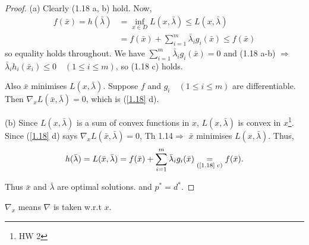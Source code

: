 \begin{proof}
    (a) Clearly (1.18 a, b) hold. Now, 
    \begin{align*}
        f(\bar{x}) = h(\bar{\lambda}) &= \inf\limits_{x\in D} L(x, \bar{\lambda}) \le L(x, \bar{\lambda}) \\
        & = f(\bar{x}) + \sum\limits_{i=1}^m \bar{\lambda}_i g_i(\bar{x}) \le f(\bar{x})
    \end{align*}
    so equality holds throughout. We have $\sum\limits_{i=1}^m \bar{\lambda}_i g_i(\bar{x}) = 0$ and (1.18 a-b) $\Rightarrow$ $\bar{\lambda}_i h_i(\bar{x}_i)\le 0\quad (1\le i\le m)$, so (1.18 c) holds. 

    Also $\bar{x}$ minimises $L(x, \bar{\lambda})$. Suppose $f$ and $g_i\quad(1\le i\le m)$ are differentiable. Then $\nabla_x L(\bar{x}, \bar{\lambda}) = 0$, which is (\ref{1.18} d).

    (b) Since $L(x, \bar{\lambda})$ is a sum of convex functions in $x$, $L(x, \bar{\lambda})$ is convex in $x$\footnote{HW 2}. Since (\ref{1.18} d) says $\nabla_x L(\bar{x}, \bar{\lambda}) = 0$, Th 1.14$\Rightarrow$ $\bar{x}$ minimises $L(x, \bar{\lambda})$. Thus, 
    \begin{align*}
        h(\bar{\lambda}) = L(\bar{x}, \bar{\lambda}) = f(\bar{x}) + \sum\limits_{i=1}^m \bar{\lambda}_i g_i(\bar{x}) \underset{\text{(\ref{1.18} c)}}{=} f(\bar{x}).
    \end{align*}

    Thus $\bar{x}$ and $\bar{\lambda}$ are optimal solutions. and $p^* = d^*$.
\end{proof}

\begin{remark}
    $\nabla_x$ means $\nabla$ is taken w.r.t $x$.
\end{remark}


